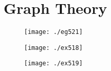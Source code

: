 \documentclass{article}
\begin{document}
\section{Graph Theory}

\begin{figure}[h!]
\centering
\texttt{[image: ./eg521]}
\caption{}
\label{fig:eg521}
\end{figure}

\begin{figure}[h!]
\centering
\texttt{[image: ./ex518]}
\caption{}
\label{fig:ex518}
\end{figure}
\begin{figure}
\centering
\texttt{[image: ./ex519]}
\caption{}
\label{fig:ex519}
\end{figure}

\end{document}
